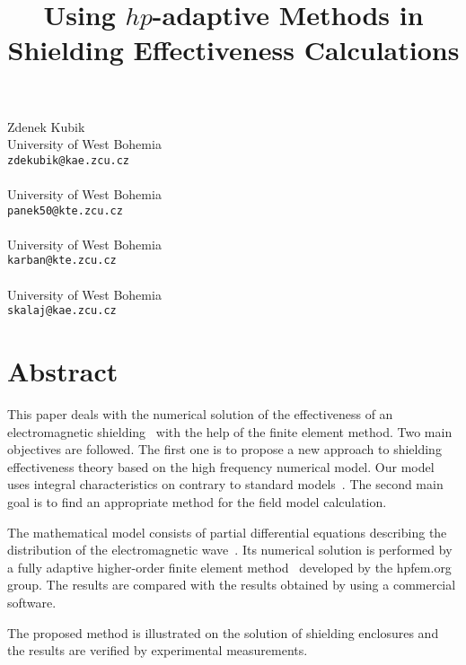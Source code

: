 \title{Using $hp$-adaptive Methods in Shielding Effectiveness Calculations}
 \author{} \institute{}
\maketitle
\begin{center}
{\large Zdenek Kubik}\\
University of West Bohemia\\
{\tt zdekubik@kae.zcu.cz}
\\ \vspace{4mm}{\large David Panek}\\
University of West Bohemia\\
{\tt panek50@kte.zcu.cz}
\\ \\
University of West Bohemia\\
{\tt karban@kte.zcu.cz}
\\ \vspace{4mm}{\large Jiri Skala}\\
University of West Bohemia\\
{\tt skalaj@kae.zcu.cz}

\end{center}

\section*{Abstract}

This paper deals with the numerical solution of the effectiveness of an electromagnetic shielding~\cite{emc} with the help of the finite element method. Two main objectives are followed. The first one is to propose a new approach to shielding effectiveness  theory based on the high frequency numerical model. Our model uses integral characteristics on contrary to standard models~\cite{celozzi}. The second main goal is to find an appropriate method for the field model calculation.     

The mathematical model consists of partial differential equations describing the distribution of the electromagnetic wave~\cite{hermes-electromagnetics}. Its numerical solution is performed by a fully adaptive higher-order finite element method~\cite{hermes-project} developed by the hpfem.org group. The results are compared with the results obtained by using a commercial software. 

The proposed method is illustrated on the solution of shielding enclosures and the results are verified by experimental measurements.

